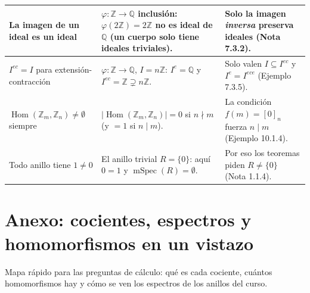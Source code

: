 \documentclass[11pt,twoside]{article}
\DeclareMathOperator{\Hom}{Hom}
\DeclareMathOperator{\mSpec}{mSpec}
\newcommand{\Z}{\mathbb{Z}}
\newcommand{\Q}{\mathbb{Q}}
\begin{document}
\begin{longtable}{p{} p{} p{}}
\hline
La imagen de un ideal es un ideal & $\varphi : \Z \to \Q$ inclusión: $\varphi(2\Z) = 2\Z$ no es ideal de $\Q$ (un cuerpo solo tiene ideales triviales). & Solo la imagen \emph{inversa} preserva ideales (Nota 7.3.2). \\
\hline
$I^{ec} = I$ para extensión-contracción & $\varphi : \Z \to \Q$, $I = n\Z$: $I^{e} = \Q$ y $I^{ec} = \Z \supsetneq n\Z$. & Solo valen $I \subseteq I^{ec}$ y $I^{e} = I^{ece}$ (Ejemplo 7.3.5). \\
\hline
$\Hom(\Z_{m}, \Z_{n}) \neq \emptyset$ siempre & $|\Hom(\Z_{m}, \Z_{n})| = 0$ si $n \nmid m$ (y $= 1$ si $n \mid m$). & La condición $f(m) = [0]_{n}$ fuerza $n \mid m$ (Ejemplo 10.1.4). \\
\hline
Todo anillo tiene $1 \neq 0$ & El anillo trivial $R = \{0\}$: aquí $0 = 1$ y $\mSpec(R) = \emptyset$. & Por eso los teoremas piden $R \neq \{0\}$ (Nota 1.1.4). \\
\hline
\end{longtable}
\renewcommand{\arraystretch}{1.0}
\newpage
\section{Anexo: cocientes, espectros y homomorfismos en un vistazo}

Mapa rápido para las preguntas de cálculo: qué es cada cociente, cuántos homomorfismos hay y cómo se ven los espectros de los anillos del curso.

\medskip
\end{document}
